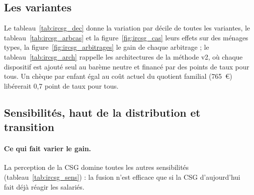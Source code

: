 



\subsection{Les variantes}

Le tableau~\ref{tab:ircsg_dec} donne la variation par décile de toutes les variantes, le tableau~\ref{tab:ircsg_arbcas}
et la figure~\ref{fig:ircsg_cas} leurs effets sur des ménages types, la figure~\ref{fig:ircsg_arbitrages} le gain de
chaque arbitrage ; le tableau~\ref{tab:ircsg_arch} rappelle les architectures de la méthode v2, où chaque dispositif est
ajouté seul au barème neutre et financé par des points de taux pour tous. Un chèque par enfant égal au coût actuel du
quotient familial (765~€) libérerait 0,7 point de taux pour tous.










\subsection{Sensibilités, haut de la distribution et transition}

\paragraph{Ce qui fait varier le gain.} La perception de la CSG domine toutes les autres sensibilités
(tableau~\ref{tab:ircsg_sens}) : la fusion n'est efficace que si la CSG d'aujourd'hui fait déjà réagir les salariés.

